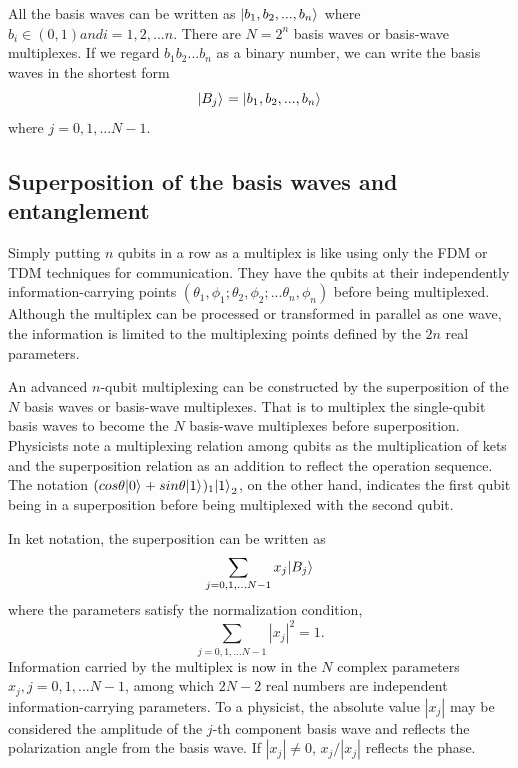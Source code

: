 \documentclass[oneside, letter, 12pt]{book}
\begin{document}
All the basis waves can be written as $\vert {b_1, b_2, ..., b_n} \rangle_{}$ where $b_i \in (0,1) and i=1, 2, ... n$. There are $N=2^n$ basis waves or basis-wave multiplexes. If we regard $b_1 b_2 ... b_n$ as a binary number, we can write the basis waves in the shortest form
\begin{equation}
    \vert {B_j} \rangle_{} = \vert {b_1, b_2, ..., b_n} \rangle_{}
\end{equation}
where $j=0, 1, ... N-1$.

\subsection{Superposition of the basis waves and entanglement}
Simply putting $n$ qubits in a row as a multiplex is like using only the FDM or TDM techniques for communication. They have the qubits at their independently information-carrying points $(\theta_1, \phi_1; \theta_2, \phi_2; ... \theta_n, \phi_n)$ before being multiplexed. Although the multiplex can be processed or transformed in parallel as one wave, the information is limited to the multiplexing points defined by the $2n$ real parameters.

An advanced $n$-qubit multiplexing can be constructed by the superposition of the $N$ basis waves or basis-wave multiplexes. That is to multiplex the single-qubit basis waves to become the $N$ basis-wave multiplexes before superposition. Physicists note a multiplexing relation among qubits as the multiplication of kets and the superposition relation as an addition to reflect the operation sequence. The notation $(cos\theta \vert {0} \rangle_{} + sin\theta \vert {1} \rangle_{})_1 {\vert {1} \rangle_{}}_2$, on the other hand, indicates the first qubit being in a superposition before being multiplexed with the second qubit.

In ket notation, the superposition can be written as
\begin{equation}
    \sum_{j = 0, 1, ... N-1} x_j \vert {B_j} \rangle_{}
\end{equation}
where the parameters satisfy the normalization condition,
\begin{equation}
    \sum_{j = 0, 1, ... N-1} |x_j|^2 =1.
\end{equation}
Information carried by the multiplex is now in the $N$ complex parameters ${x_j, j=0, 1, ... N-1}$, among which $2N-2$ real numbers are independent information-carrying parameters. To a physicist, the absolute value $|x_j|$ may be considered the amplitude of the $j$-th component basis wave and reflects the polarization angle from the basis wave. If $|x_j| \neq 0$, $x_j / |x_j|$ reflects the phase.
\end{document}
